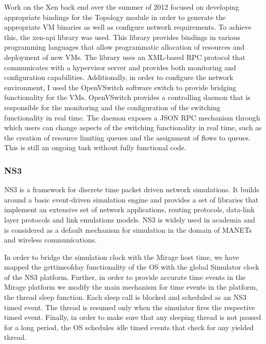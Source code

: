 Work on the Xen back end over the summer of 2012 focused on developing
appropriate bindings for the Topology module in order to generate the
appropriate VM binaries as well as configure network requirements.  To
achieve this, the xen-api library was used. This library provides
bindings in various programming languages that allow programmatic
allocation of resources and deployment of new VMs.  The library uses an
XML-based RPC protocol that communicates with a hypervisor server and
provides both monitoring and configuration capabilities.
Additionally, in order to configure the network environment, I used
the OpenVSwitch software switch to provide bridging
functionality for the VMs. OpenVSwitch provides a controlling
daemon that is responsible for the monitoring and the configuration of
the switching functionality in real time.  The daemon exposes a JSON
RPC mechanism through which users can change aspects of the switching
functionality in real time, such as the creation of resource limiting
queues and the assignment of flows to queues. This is still an ongoing
task without fully functional code.


\subsubsection{NS3}

NS3 is a framework for discrete time packet driven network simulations. It
builds around a basic event-driven simulation engine and provides a set of
libraries that implement an extensive set of network applications, routing
protocols, data-link layer protocols and link emulations models. NS3 is widely
used in academia and is considered as a default mechanism for simulation in the
domain of MANETs and wireless communications. 

In order to bridge the simulation clock with the Mirage host time, we have
mapped the gettimeofday functionality of the OS with the global Simulator
clock of the NS3 platform. Further, in order to provide accurate time events in
the Mirage platform we modify the main mechanism for time events in the
platform, the thread sleep function. Each sleep call is blocked and scheduled
as an NS3 timed event. The thread is resumed only when the simulator fires the
respective timed event. Finally, in order to make sure that any sleeping thread
is not paused for a long period, the OS schedules {\emph idle} timed events that
check for any yielded thread.

